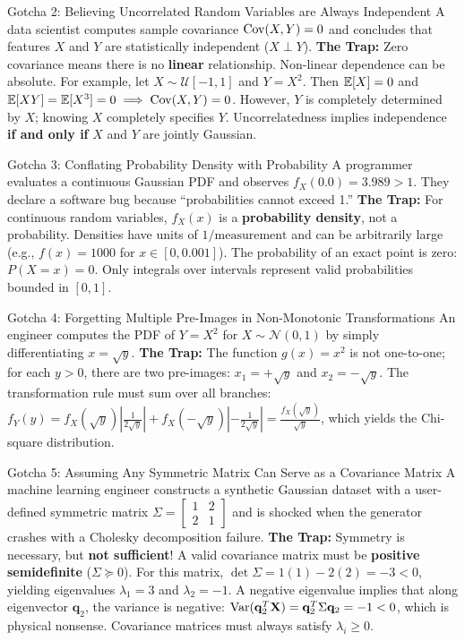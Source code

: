 \begin{trapbox}{Gotcha 2: Believing Uncorrelated Random Variables are Always Independent}
A data scientist computes sample covariance $\operatorname{Cov}(X, Y) = 0$ and concludes that features $X$ and $Y$ are statistically independent ($X \perp Y$).
\textbf{The Trap:} Zero covariance means there is no \textbf{linear} relationship. Non-linear dependence can be absolute. For example, let $X \sim \mathcal{U}[-1, 1]$ and $Y = X^2$. Then $\operatorname{\mathbb{E}}[X] = 0$ and $\operatorname{\mathbb{E}}[XY] = \operatorname{\mathbb{E}}[X^3] = 0 \implies \operatorname{Cov}(X, Y) = 0$. However, $Y$ is completely determined by $X$; knowing $X$ completely specifies $Y$. Uncorrelatedness implies independence \textbf{if and only if} $X$ and $Y$ are jointly Gaussian.
\end{trapbox}

\begin{trapbox}{Gotcha 3: Conflating Probability Density with Probability}
A programmer evaluates a continuous Gaussian PDF and observes $f_X(0.0) = 3.989 > 1$. They declare a software bug because ``probabilities cannot exceed 1.''
\textbf{The Trap:} For continuous random variables, $f_X(x)$ is a \textbf{probability density}, not a probability. Densities have units of $1/\text{measurement}$ and can be arbitrarily large (e.g., $f(x) = 1000$ for $x \in [0, 0.001]$). The probability of an exact point is zero: $P(X = x) = 0$. Only integrals over intervals represent valid probabilities bounded in $[0, 1]$.
\end{trapbox}

\begin{trapbox}{Gotcha 4: Forgetting Multiple Pre-Images in Non-Monotonic Transformations}
An engineer computes the PDF of $Y = X^2$ for $X \sim \mathcal{N}(0, 1)$ by simply differentiating $x = \sqrt{y}$.
\textbf{The Trap:} The function $g(x) = x^2$ is not one-to-one; for each $y > 0$, there are two pre-images: $x_1 = +\sqrt{y}$ and $x_2 = -\sqrt{y}$. The transformation rule must sum over all branches:
$f_Y(y) = f_X(\sqrt{y})\left|\frac{1}{2\sqrt{y}}\right| + f_X(-\sqrt{y})\left|-\frac{1}{2\sqrt{y}}\right| = \frac{f_X(\sqrt{y})}{\sqrt{y}}$, which yields the Chi-square distribution.
\end{trapbox}

\begin{trapbox}{Gotcha 5: Assuming Any Symmetric Matrix Can Serve as a Covariance Matrix}
A machine learning engineer constructs a synthetic Gaussian dataset with a user-defined symmetric matrix $\Sigma = \begin{bmatrix} 1 & 2 \\ 2 & 1 \end{bmatrix}$ and is shocked when the generator crashes with a Cholesky decomposition failure.
\textbf{The Trap:} Symmetry is necessary, but \textbf{not sufficient}! A valid covariance matrix must be \textbf{positive semidefinite} ($\Sigma \succeq 0$). For this matrix, $\det \Sigma = 1(1) - 2(2) = -3 < 0$, yielding eigenvalues $\lambda_1 = 3$ and $\lambda_2 = -1$. A negative eigenvalue implies that along eigenvector $\mathbf{q}_2$, the variance is negative: $\operatorname{Var}(\mathbf{q}_2^T \mathbf{X}) = \mathbf{q}_2^T \Sigma \mathbf{q}_2 = -1 < 0$, which is physical nonsense. Covariance matrices must always satisfy $\lambda_i \ge 0$.
\end{trapbox}

